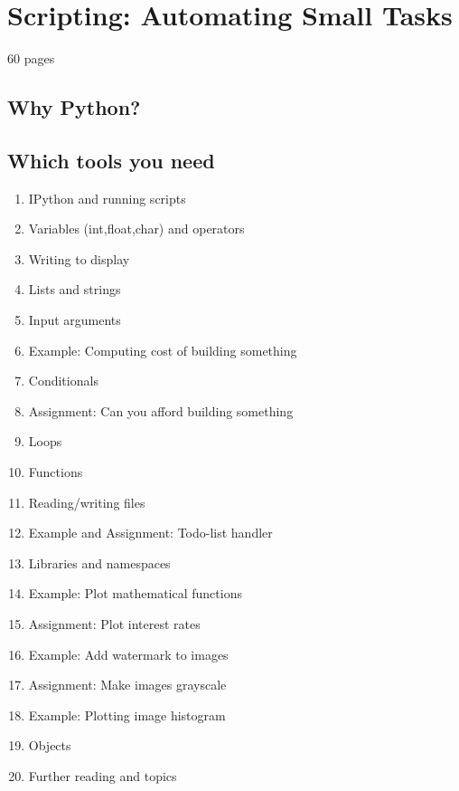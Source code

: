 \chapter{Scripting: Automating Small Tasks}\label{ch:python}
60 pages
\section{Why Python?}
\section{Which tools you need}

\begin{enumerate}
	\item IPython and running scripts
	\item Variables (int,float,char) and operators
	\item Writing to display
	\item Lists and strings
	\item Input arguments
	\item Example: Computing cost of building something
	\item Conditionals
	\item Assignment: Can you afford building something
	\item Loops
	\item Functions
	\item Reading/writing files
	\item Example and Assignment: Todo-list handler
	\item Libraries and namespaces
	\item Example: Plot mathematical functions
	\item Assignment: Plot interest rates
	\item Example: Add watermark to images
	\item Assignment: Make images grayscale
	\item Example: Plotting image histogram
	\item Objects
	\item Further reading and topics
\end{enumerate}